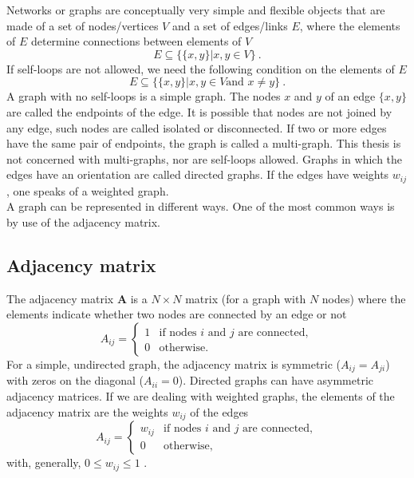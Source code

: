 \documentclass[11 pt , letterpaper , twoside , openright]{book}
\begin{document}
Networks or graphs are conceptually very simple and flexible objects that are made of a set of nodes/vertices $V$ and a set of edges/links $E$, where the elements of $E$ determine connections between elements of $V$ \cite{Costa2018}
\begin{equation}
	E \subseteq \{\{x, y\}| x, y \in V \}\ .
\end{equation}
If self-loops are not allowed, we need the following condition on the elements of $E$
\begin{equation}
	E \subseteq \{\{x, y\}| x, y \in V \text{and\ } x \neq y \} \ .
\end{equation}
A graph with no self-loops is a simple graph. The nodes $x$ and $y$ of an edge $\{x, y\}$ are called the endpoints of the edge. It is possible that nodes are not joined by any edge, such nodes are called isolated or disconnected. If two or more edges have the same pair of endpoints, the graph is called a multi-graph. This thesis is not concerned with multi-graphs, nor are self-loops allowed. Graphs in which the edges have an orientation are called directed graphs. If the edges have weights $w_{ij}$, one speaks of a weighted graph.\\
A graph can be represented in different ways. One of the most common ways is by use of the adjacency matrix.\\

\subsection{Adjacency matrix}

The adjacency matrix \textbf{A} is a $N \times N$ matrix (for a graph with $N$ nodes) where the elements indicate whether two nodes are connected by an edge or not \cite{Mata2020}
\begin{equation}
	A_{ij} = 
	\begin{cases}
		1 & \text{if nodes $i$ and $j$ are connected},\\
		0 & \text{otherwise}.
	\end{cases}
\end{equation}
For a simple, undirected graph, the adjacency matrix is symmetric ($A_{ij} = A_{ji}$) with zeros on the diagonal ($A_{ii} = 0$). Directed graphs can have asymmetric adjacency matrices. If we are dealing with weighted graphs, the elements of the adjacency matrix are the weights $w_{ij}$ of the edges
\begin{equation}
	A_{ij} = 
	\begin{cases}
		w_{ij} & \text{if nodes $i$ and $j$ are connected},\\
		0 & \text{otherwise},
	\end{cases}
\end{equation}
with, generally, $0 \leqslant w_{ij} \leqslant 1$ \cite{Mata2020}. \\
\end{document}
